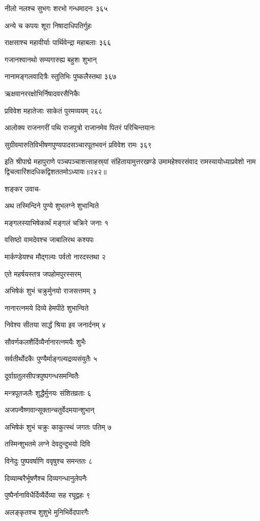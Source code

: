 नीलो नलश्च सुभगः शरभो गन्धमादनः ३६५

अन्ये च कपयः शूरा निषादाधिपतिर्गुहः

राक्षसाश्च महावीर्याः पार्थिवेन्द्रा महाबलाः ३६६

गजानश्वानथो सम्यगारुह्य बहुशः शुभान्

नानामङ्गलवादित्रैः स्तुतिभिः पुष्कलैस्तथा ३६७

ऋक्षवानररक्षोभिर्निषादवरसैनिकैः

प्रविवेश महातेजाः साकेतं पुरमव्ययम् २६८

आलोक्य राजनगरीं पथि राजपुत्रो राजानमेव पितरं परिचिन्तयानः

सुग्रीवमारुतिविभीषणपुण्यपादसञ्चारपूतभवनं प्रविवेश रामः ३६९

इति श्रीपाद्मे महापुराणे पञ्चपञ्चाशत्साहस्र्यां संहितायामुत्तरखण्डे उमामहेश्वरसंवाद रामस्यायोध्याप्रवेशो नाम द्विचत्वारिंशदधिकद्विशततमोऽध्यायः॥२४२॥


शङ्कर उवाच-

अथ तस्मिन्दिने पुण्ये शुभलग्ने शुभान्विते

मङ्गलस्याभिषेकार्थं मङ्गलं चक्रिरे जनाः १

वसिष्ठो वामदेवश्च जाबालिरथ कश्यपः

मार्कण्डेयश्च मौद्गल्यः पर्वतो नारदस्तथा २

एते महर्षयस्तत्र जपहोमपुरस्सरम्

अभिषेकं शुभं चक्रुर्मुनयो राजसत्तमम् ३

नानारत्नमये दिव्ये हेमपीठे शुभान्विते

निवेश्य सीतया सार्द्धं श्रिया इव जनार्दनम् ४

सौवर्णकलशैर्दिव्यैर्नानारत्नमयैः शुभैः

सर्वतीर्थोदकैः पुण्यैर्माङ्गल्यद्रव्यसंयुतैः ५

दूर्वाग्रतुलसीपत्रपुष्पगन्धसमन्वितैः

मन्त्रपूतजलैः शुद्धैर्मुनयः संशितव्रताः ६

अजपन्वैष्णवान्सूक्तान्चतुर्वेदमयान्शुभान्

अभिषेकं शुभं चक्रुः काकुत्स्थं जगतः पतिम् ७

तस्मिन्शुभतमे लग्ने देवदुन्दुभयो दिवि

विनेदुः पुष्पवर्षाणि ववृषुश्च समन्ततः ८

दिव्याम्बरैर्भूषणैश्च दिव्यगन्धानुलेपनैः

पुष्पैर्नानाविधैर्दिव्यैर्देव्या सह रघूद्वहः ९

अलङ्कृतश्च शुशुभे मुनिभिर्वेदपारगैः

